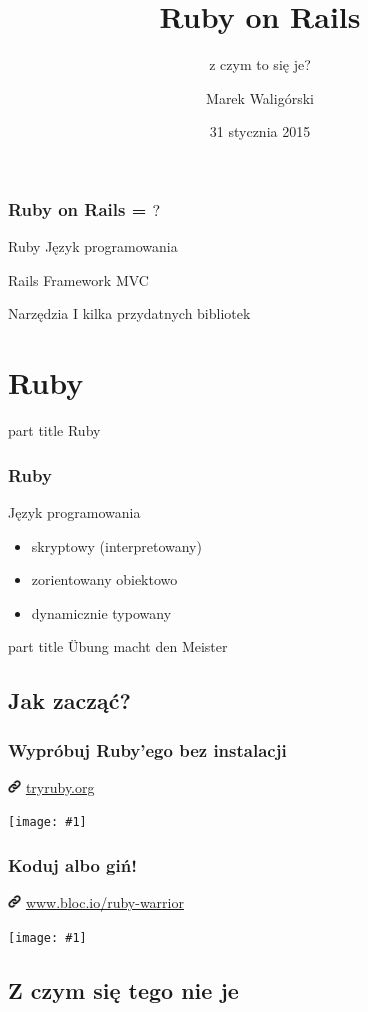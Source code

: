 \documentclass{beamer}
\title{Ruby on Rails}
\subtitle{z czym to się je?}
\author{Marek Waligórski}
\date{31 stycznia 2015}
\institute{InfoMEET Poznań}
\newcommand{\myfullimage}[1]{%
    \hspace*{-1.1cm}
    \texttt{[image: \#1]}
}
\newcommand{\myurl}[1]{%
    \begin{block}{}
       \centering \huge
       \includegraphics[width=0.35cm]{link.png}
       \hspace{0.1cm}
       \url{#1}
    \end{block}
}
\newcommand{\mytitle}[1]{%
    \begin{frame}[plain]
        \begin{centering}
        \vspace{1em}\par
            \begin{beamercolorbox}[rounded=true,sep=4pt,center]{part title}
               \huge #1
            \end{beamercolorbox}
        \end{centering}
    \end{frame}
}
\newcommand{\mysection}[1]{%
    \section{#1}
    \mytitle{#1}
}
\begin{document}
\begin{frame}[plain]
\titlepage
\end{frame}

\begin{frame}[plain]
\frametitle{Ruby on Rails = $?$}
\begin{block}{Ruby}
    Język programowania
\end{block}
\begin{block}{Rails}
    Framework MVC
\end{block}
\begin{block}{Narzędzia}
    I kilka przydatnych bibliotek
\end{block}
\end{frame}

\mysection{Ruby}

\begin{frame}[fragile]\frametitle{Ruby}
    \begin{block}{Język programowania}
    \begin{itemize}
        \item skryptowy (interpretowany)
        \item zorientowany obiektowo
        \item dynamicznie typowany
    \end{itemize}
    \end{block}
\end{frame}

\mytitle{\centering \huge \color{orange} Übung macht den Meister \par}

\subsection{Jak zacząć?}
\begin{frame}[fragile]
\frametitle{Wypróbuj Ruby'ego bez instalacji}
    \myurl{tryruby.org}
    \myfullimage{tryruby.png}
\end{frame}
\begin{frame}[fragile]
\frametitle{Koduj albo giń!}
    \myurl{www.bloc.io/ruby-warrior}
    \myfullimage{rubywarrior.png}
\end{frame}



\subsection{Z czym się tego nie je}
\end{document}
